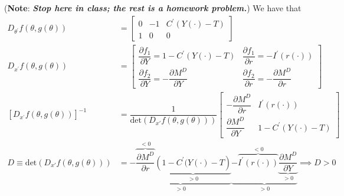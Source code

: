\documentclass{article}
\theoremstyle{mythm}
\theoremstyle{mydef}
\begin{document}
(\textbf{Note}: \textbf{\textit{Stop here in class; the rest is a homework problem.}}) We have that
\begin{align*}
  D_{\theta^\prime} f(\theta, g(\theta))
  & =
  \left[\begin{matrix}
      0
    & -1
    & C^\prime(Y(\cdot) - T) \\[6pt]
      1
    & 0
    & 0
  \end{matrix}\right] \\[6pt]
  D_{x^\prime} f(\theta, g(\theta))
  & =
  \left[\begin{matrix}
      \dfrac{\partial f_1}{\partial Y} = 1 - C^\prime(Y(\cdot) - T)
    & \dfrac{\partial f_1}{\partial r} = -I^\prime(r(\cdot)) \\[6pt]
      \dfrac{\partial f_2}{\partial Y} = -\dfrac{\partial M^D}{\partial Y}
    & \dfrac{\partial f_2}{\partial r} = -\dfrac{\partial M^D}{\partial r}
  \end{matrix}\right] \\[6pt]
  \left[D_{x^\prime} f(\theta, g(\theta))\right]^{-1}
  & =
  \dfrac{1}{\text{det}(D_{x'}f(\theta,g(\theta)))}
  \left[\begin{matrix}
      - \dfrac{\partial M^D}{\partial r}
    & I^\prime(r(\cdot)) \\[6pt]
      \dfrac{\partial M^D}{\partial Y}
    & 1 - C^\prime(Y(\cdot) - T)
  \end{matrix}\right] \\[6pt]
  D\equiv \text{det}(D_{x'}f(\theta,g(\theta))) & =
  \underbrace{
   - \overbrace{\dfrac{\partial M^D}{\partial r}}^{< 0}
     \underbrace{\left(1 - C^\prime(Y(\cdot) - T\right)}_{> 0}
   }_{> 0}
  \underbrace{
   - \overbrace{I^\prime(r(\cdot))}^{< 0}
     \underbrace{\dfrac{\partial M^D}{\partial Y}}_{> 0}
   }_{> 0}
   \implies D > 0
\end{align*}
\end{document}
